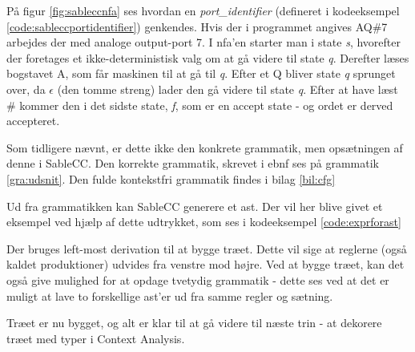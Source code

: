\noindent På figur \ref{fig:sableccnfa} ses hvordan en \textit{port\_identifier} (defineret i kodeeksempel \ref{code:sableccportidentifier}) genkendes. Hvis der i programmet angives AQ\#7 arbejdes der med analoge output-port 7. I \gls{nfa}'en starter man i state \textit{s}, hvorefter der foretages et ikke-deterministisk valg om at gå videre til state  \textit{q}. Derefter læses bogstavet A, som får maskinen til at gå til \textit{q}. Efter et Q bliver state \textit{q} sprunget over, da $\epsilon$ (den tomme streng) lader den gå videre til state \textit{q}. Efter at have læst \# kommer den i det sidste state, \textit{f}, som er en accept state - og ordet er derved accepteret. \\


\noindent Som tidligere nævnt, er dette ikke den konkrete grammatik, men opsætningen af denne i SableCC. Den korrekte grammatik, skrevet i \gls{ebnf} ses på grammatik \ref{gra:udsnit}. Den fulde kontekstfri grammatik findes i bilag \ref{bil:cfg}



\noindent Ud fra grammatikken kan SableCC generere et \gls{ast}. Der vil her blive givet et eksempel ved hjælp af dette udtrykket, som ses i kodeeksempel \ref{code:exprforast}


\noindent Der bruges left-most derivation til at bygge træet. Dette vil sige at reglerne (også kaldet produktioner) udvides fra venstre mod højre. Ved at bygge træet, kan det også give mulighed for at opdage tvetydig grammatik - dette ses ved at det er muligt at lave to forskellige \gls{ast}'er ud fra samme regler og sætning.


\noindent Træet er nu bygget, og alt er klar til at gå videre til næste trin - at dekorere træet med typer i Context Analysis.